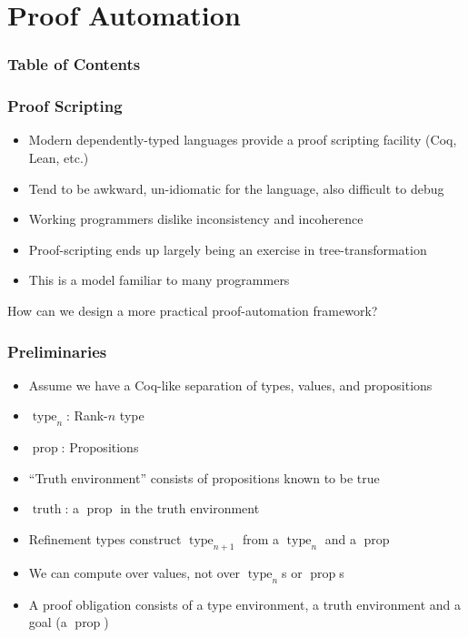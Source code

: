 \documentclass{beamer}
\newcommand{\typekw}[1]{\ensuremath{{\operatorname{type}}_{#1}}}
\newcommand{\propkw}{\ensuremath{\operatorname{prop}}}
\newcommand{\truthkw}{\ensuremath{\operatorname{truth}}}
\begin{document}
\section{Proof Automation}

\begin{frame}
  \frametitle{Table of Contents}
  \tableofcontents[currentsection]
\end{frame}

\begin{frame}
  \frametitle{Proof Scripting}
  \begin{itemize}
    \item Modern dependently-typed languages provide a proof scripting
      facility (Coq, Lean, etc.)
    \item Tend to be awkward, un-idiomatic for the language, also
      difficult to debug
    \item Working programmers dislike inconsistency and incoherence
    \item Proof-scripting ends up largely being an exercise in
      tree-transformation
    \item This is a model familiar to many programmers
  \end{itemize}
  How can we design a more practical proof-automation framework?
\end{frame}

\begin{frame}
  \frametitle{Preliminaries}
  \begin{itemize}
    \item Assume we have a Coq-like separation of types, values, and
      propositions
    \item \typekw{n}: Rank-$n$ type
    \item \propkw{}: Propositions
    \item ``Truth environment'' consists of propositions known to be true
    \item \truthkw{}: a \propkw{} in the truth environment
    \item Refinement types construct \typekw{n+1} from a \typekw{n}
      and a \propkw{}
    \item We can compute over values, not over \typekw{n}s or
      \propkw{}s
    \item A proof obligation consists of a type environment, a truth
      environment and a goal (a \propkw)
  \end{itemize}
\end{frame}
\end{document}
